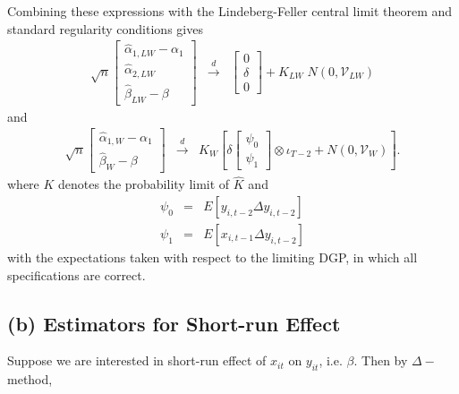 Combining these expressions with the Lindeberg-Feller central limit theorem and standard regularity conditions gives
	\begin{eqnarray}
			\label{eq:dynpan2SRvsLR}
 			\sqrt{n} \left[\begin{array}{l} \widehat{\alpha}_{1,LW}-\alpha_1\\ 
\widehat{\alpha}_{2,LW}\\ 			
 			\widehat{\beta}_{LW} - \beta \end{array}\right]   &\overset{d}{\rightarrow}& \left[\begin{array}{c} 0 \\ \delta\\ 0\end{array}\right] +K_{LW}\; N\left(0, \mathcal{V}_{LW}\right)
	\end{eqnarray}
and
\begin{eqnarray}
 	\sqrt{n}\left[\begin{array}{l} \widehat{\alpha}_{1,W}-\alpha_1\\ 
			\widehat{\beta}_{W} - \beta \end{array}\right]  &\overset{d}{\rightarrow}&K_W  \left[\delta \left[\begin{array}{l} \psi_0\\ 
\psi_1 \end{array}\right]  \otimes \iota_{T-2} + N\left(0, \mathcal{V}_W\right) \right].
	\end{eqnarray}
where $K$ denotes the probability limit of $\widehat{K}$  and
	\begin{eqnarray}
		\psi_0 &=&E[y_{i,t-2}\Delta y_{i,t-2}] \\
		\psi_1 &=&E[x_{i,t-1} \Delta y_{i,t-2}]
	\end{eqnarray}	
with the expectations taken with respect to the limiting DGP, in which all specifications are correct. 

\subsection*{(b) Estimators for Short-run Effect}

\vspace{0.1in}

Suppose we are interested in short-run effect of $x_{it}$ on $y_{it}$, i.e. $\beta$.  Then  by $\Delta-$method,

